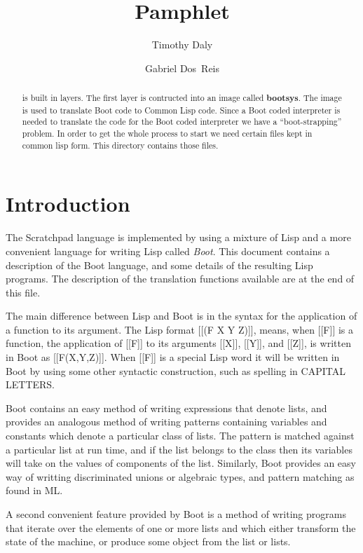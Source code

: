 \documentclass{article}
\title{\File{src/boot/Makefile} Pamphlet}
\author{Timothy Daly \and Gabriel Dos~Reis}
\begin{document}
\maketitle

\begin{abstract}
   is built in layers. The first layer is contructed into
  an image called {\bf bootsys}. The  image is used
  to translate Boot code to Common Lisp code.  Since a Boot coded
  interpreter is needed to translate the code for the Boot coded
  interpreter we have a ``boot-strapping'' problem.  In order to get
  the whole process to start we need certain files kept in 
  common lisp form. This directory contains those files.
\end{abstract}
\eject

\tableofcontents
\eject

\section{Introduction}
\label{sec:intro}
 
The Scratchpad language is implemented by using a mixture of Lisp and
a more convenient language for writing Lisp called \emph{Boot}.
This document contains a description of the Boot language, and some
details of the resulting Lisp programs.
The description of the translation
functions available are at the end of this file.
 
The main difference between Lisp and Boot is in the syntax for
the application of a function to its argument.
The Lisp format [[(F X Y Z)]], means, when [[F]] is a function,
the application of [[F]] to its arguments [[X]], [[Y]], and [[Z]],
is written in Boot as [[F(X,Y,Z)]].
When [[F]] is a special Lisp word it will be written
in Boot by using some other syntactic construction, such as spelling
in CAPITAL LETTERS.
 
Boot contains an easy method of writing expressions that denote lists,
and provides an analogous method of writing patterns containing variables
and constants which denote a particular class of lists.  The pattern
is matched against a particular list at run time,
and if the list belongs to the class then its variables will
take on the values of components of the list.  Similarly, Boot provides
an easy way of writting discriminated unions or algebraic types, and 
pattern matching as found in ML.
 
 A second convenient feature provided by Boot is a method of
writing programs that iterate over the elements of one or more lists
and which either transform the state of the machine, or
produce some object from the list or lists.
\end{document}

